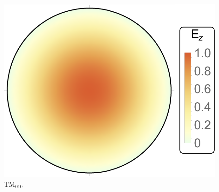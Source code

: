 \documentclass[12pt,xcolor=dvipsnames,professionalfonts]{beamer}
\begin{document}
\begin{frame}[t]
	\begin{columns}[T]
		\begin{figure}[h]
			\centering
			\hspace*{0.70cm}\includegraphics[scale=0.4]{./figures/tm010.pdf}
			\vspace*{-0.2cm}
			\caption{$\mathrm{TM}_{010}$}
		\end{figure}
		

\end{columns}
\end{frame}
\end{document}
